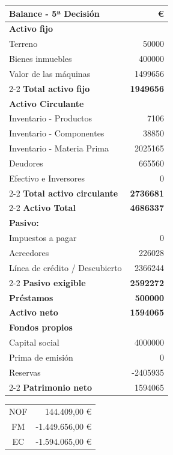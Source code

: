 \begin{table}[h]
    \centering
    \begin{tabular}{lr}
        \textbf{Balance - 5ª Decisión}               & \textbf{€} \\
        \hline
        \textbf{Activo fijo}                & \\
        Terreno                             & 50000 \\
        Bienes inmuebles                    & 400000 \\
        Valor de las máquinas               & 1499656 \\
        \cline{2-2}
        \textbf{Total activo fijo}          & \textbf{1949656} \\
        \textbf{Activo Circulante}          & \\
        Inventario - Productos              & 7106 \\
        Inventario - Componentes            & 38850 \\
        Inventario - Materia Prima          & 2025165 \\
        Deudores                            & 665560 \\
        Efectivo e Inversores               & 0 \\
        \cline{2-2}
        \textbf{Total activo circulante}    & \textbf{2736681} \\
        \cline{2-2}
        \textbf{Activo Total}               & \textbf{4686337} \\
        \textbf{Pasivo:}                    & \\
        Impuestos a pagar                   & 0 \\
        Acreedores                          & 226028 \\
        Línea de crédito / Descubierto      & 2366244 \\
        \cline{2-2}
        \textbf{Pasivo exigible}            & \textbf{2592272} \\
        \textbf{Préstamos}                  & \textbf{500000} \\
        \textbf{Activo neto}                & \textbf{1594065} \\
        \textbf{Fondos propios}             & \\
        Capital social                      & 4000000 \\
        Prima de emisión                    & 0 \\
        Reservas                            & -2405935 \\
        \cline{2-2}
        \textbf{Patrimonio neto}            & 1594065 
    \end{tabular}
\end{table}

\begin{table}[h]
    \centering
    \begin{tabular}{|c|r|}
        \hline
        NOF & 144.409,00 € \\
        FM & -1.449.656,00 € \\
        EC & -1.594.065,00 € \\
        \hline
    \end{tabular}
\end{table}